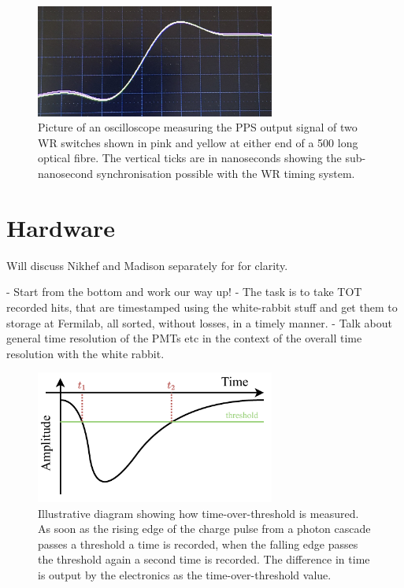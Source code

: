 \begin{figure} %
    \includegraphics[width=0.7\textwidth]{diagrams/5-daq/sync.jpg}
    \caption[Picture of White Rabbit timing synchronisation seen in \chips.]
    {Picture of an oscilloscope measuring the PPS output signal of two WR switches shown in pink
        and yellow at either end of a \unit{500}{} long optical fibre. The vertical
        ticks are in nanoseconds showing the sub-nanosecond synchronisation possible with the WR
        timing system.}
    \label{fig:sync}
\end{figure}

\section{Hardware} %
\label{sec:daq_hard} %

Will discuss Nikhef and Madison separately for for clarity.

- Start from the bottom and work our way up!
- The task is to take TOT recorded hits, that are timestamped using the white-rabbit stuff and get
them to storage at Fermilab, all sorted, without losses, in a timely manner.
- Talk about general time resolution of the PMTs etc in the context of the overall time resolution
with the white rabbit.

\begin{figure} %
    \includegraphics[width=0.7\textwidth]{diagrams/5-daq/tot.pdf}
    \caption[Illustrative diagram showing how time-over-threshold is measured.]
    {Illustrative diagram showing how time-over-threshold is measured. As soon as the rising edge
        of the charge pulse from a photon cascade passes a threshold a time is recorded, when the
        falling edge passes the threshold again a second time is recorded. The difference in time
        is output by the electronics as the time-over-threshold value.}
    \label{fig:tot}
\end{figure}

